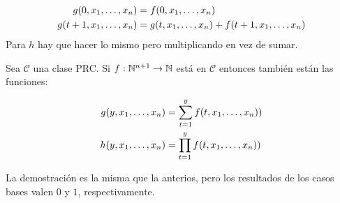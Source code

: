 \begin{demo}
	\vspace*{-0.5cm}
\begin{align*}
	g(0,x_1,\dots, x_{n}) &= f(0, x_1,\dots, x_{n}) \\
	g(t+1,x_1,\dots, x_{n}) &= g(t, x_1,\dots, x_{n}) + f(t+1, x_1,\dots, x_{n})
\end{align*}
Para $h$ hay que hacer lo mismo pero multiplicando en vez de sumar.
\end{demo}

\begin{teorema}
Sea $\mathcal{C}$ una clase PRC. Si $f:\mathbb{N}^{n+1}\to\mathbb{N}$ está en $\mathcal{C}$ entonces también están las funciones:

\begin{align*}
	g(y,x_1,\dots, x_{n}) &= \sum_{t=1}^{y} f(t,x_1,\dots, x_{n})) \\
	h(y,x_1,\dots, x_{n}) &= \prod_{t=1}^{y} f(t,x_1,\dots, x_{n})) \\
\end{align*}

\end{teorema}

La demostración es la misma que la anterios, pero los resultados de los casos bases valen $0$ y $1$, respectivamente.

